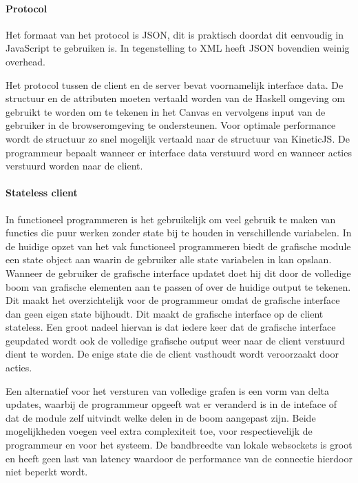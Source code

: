 \paragraph{Protocol}
Het formaat van het protocol is JSON, dit is praktisch doordat dit eenvoudig in JavaScript te gebruiken is. In tegenstelling to XML heeft JSON bovendien weinig overhead.

Het protocol tussen de client en de server bevat voornamelijk interface data. De structuur en de attributen moeten vertaald worden van de Haskell omgeving om gebruikt te worden om te tekenen in het Canvas en vervolgens input van de gebruiker in de browseromgeving te ondersteunen. Voor optimale performance wordt de structuur zo snel mogelijk vertaald naar de structuur van KineticJS. De programmeur bepaalt wanneer er interface data verstuurd word en wanneer acties verstuurd worden naar de client.

\paragraph{Stateless client}
In functioneel programmeren is het gebruikelijk om veel gebruik te maken van functies die puur werken zonder state bij te houden in verschillende variabelen. In de huidige opzet van het vak functioneel programmeren biedt de grafische module een state object aan waarin de gebruiker alle state variabelen in kan opslaan. Wanneer de gebruiker de grafische interface updatet doet hij dit door de volledige boom van grafische elementen aan te passen of over de huidige output te tekenen. Dit maakt het overzichtelijk voor de programmeur omdat de grafische interface dan geen eigen state bijhoudt. Dit maakt de grafische interface op de client stateless. Een groot nadeel hiervan is dat iedere keer dat de grafische interface geupdated wordt ook de volledige grafische output weer naar de client verstuurd dient te worden. De enige state die de client vasthoudt wordt veroorzaakt door acties.

Een alternatief voor het versturen van volledige grafen is een vorm van delta updates, waarbij de programmeur opgeeft wat er veranderd is in de inteface of dat de module zelf uitvindt welke delen in de boom aangepast zijn. Beide mogelijkheden voegen veel extra complexiteit toe, voor respectievelijk de programmeur en voor het systeem. De bandbreedte van lokale websockets is groot en heeft geen last van latency waardoor de performance van de connectie hierdoor niet beperkt wordt.
